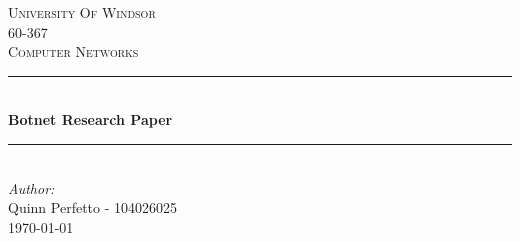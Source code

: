 \begin{titlepage}

\newcommand{\HRule}{\rule{\linewidth}{0.5mm}} %

\center %


\textsc{\LARGE University Of Windsor}\\[1.5cm] %
\textsc{\Large 60-367}\\[0.5cm] %
\textsc{\large Computer Networks}\\[0.5cm] %


\HRule \\[0.4cm]
{ \huge \bfseries Botnet Research Paper}\\[0.4cm] %
\HRule \\[1.5cm]


\Large \emph{Author:}\\
Quinn Perfetto - 104026025\\[3cm] %


{\large \today}\\[2cm] %

\vfill %

\end{titlepage}


\tableofcontents

